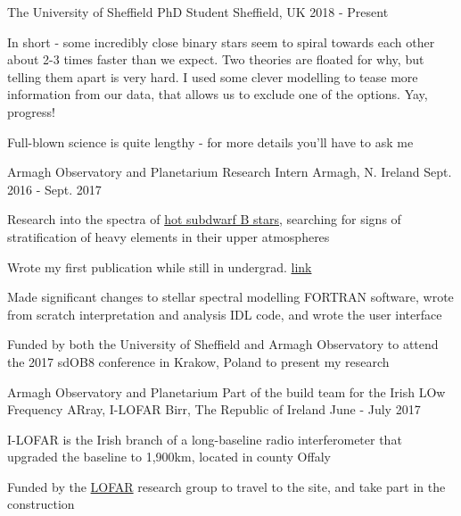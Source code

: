 \begin{cventries}


  \cventry
    {The University of Sheffield}
    {PhD Student}
    {Sheffield, UK}
    {2018 - Present}
    {
      \begin{cvitems}
        \item {In short - some incredibly close binary stars seem to spiral towards each other about 2-3 times faster than we expect. Two theories are floated for why, but telling them apart is very hard. I used some clever modelling to tease more information from our data, that allows us to exclude one of the options. Yay, progress!}
        \item {Full-blown science is quite lengthy - for more details you'll have to ask me}
    \end{cvitems}
    }


  \cventry
    {Armagh Observatory and Planetarium}
  	{Research Intern}
    {Armagh, N. Ireland}
    {Sept. 2016 - Sept. 2017}
    {
      \begin{cvitems}
        \item {Research into the spectra of \href{https://en.wikipedia.org/wiki/Subdwarf_B_star}{hot subdwarf B stars}, searching for signs of stratification of heavy elements in their upper atmospheres}
        \item {Wrote my first publication while still in undergrad. \href{https://arxiv.org/abs/1710.01663}{link}}
        \item {Made significant changes to stellar spectral modelling FORTRAN software, wrote from scratch interpretation and analysis IDL code, and wrote the user interface}
        \item {Funded by both the University of Sheffield and Armagh Observatory to attend the 2017 {sdOB8} conference in Krakow, Poland to present my research}
      \end{cvitems}
    }
    
  \cventry
    {Armagh Observatory and Planetarium}
    {Part of the build team for the Irish LOw Frequency ARray, I-LOFAR}
    {Birr, The Republic of Ireland}
    {June - July 2017}
    {
    \begin{cvitems}
      \item {I-LOFAR is the Irish branch of a long-baseline radio interferometer that upgraded the baseline to 1,900km, located in county Offaly}
      \item {Funded by the \href{https://en.wikipedia.org/wiki/Low-Frequency_Array_(LOFAR)}{LOFAR} research group to travel to the site, and take part in the construction}
    \end{cvitems}
    }
    

\end{cventries}
